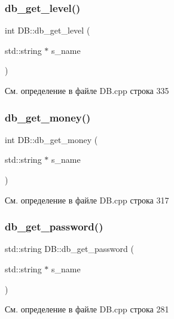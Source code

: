 \mbox{\label{class_d_b_a7792fdc9d2dc66bfa5ba84aa9db1ee8b}} 
\subsubsection{\texorpdfstring{db\_get\_level()}{db\_get\_level()}}
{\footnotesize\ttfamily int D\+B\+::db\+\_\+get\+\_\+level (\begin{DoxyParamCaption}\item[{std\+::string $\ast$}]{s\+\_\+name }\end{DoxyParamCaption})}



См. определение в файле D\+B.\+cpp строка 335

\mbox{\label{class_d_b_a004b212ee48936251ff24b9f70d67dd0}} 
\subsubsection{\texorpdfstring{db\_get\_money()}{db\_get\_money()}}
{\footnotesize\ttfamily int D\+B\+::db\+\_\+get\+\_\+money (\begin{DoxyParamCaption}\item[{std\+::string $\ast$}]{s\+\_\+name }\end{DoxyParamCaption})}



См. определение в файле D\+B.\+cpp строка 317

\mbox{\label{class_d_b_a35efc0a2ff41b4ef47c88c87f20feee4}} 
\subsubsection{\texorpdfstring{db\_get\_password()}{db\_get\_password()}}
{\footnotesize\ttfamily std\+::string D\+B\+::db\+\_\+get\+\_\+password (\begin{DoxyParamCaption}\item[{std\+::string $\ast$}]{s\+\_\+name }\end{DoxyParamCaption})}



См. определение в файле D\+B.\+cpp строка 281

